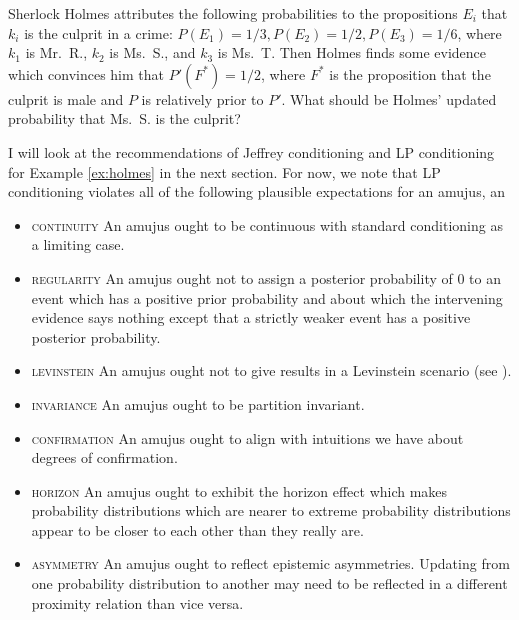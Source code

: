 \documentclass[11pt]{article}
\begin{document}
\begin{quotex}
  \label{ex:holmes} Sherlock Holmes
  attributes the following probabilities to the propositions $E_{i}$
  that $k_{i}$ is the culprit in a crime:
  $P(E_{1})=1/3,P(E_{2})=1/2,P(E_{3})=1/6$, where $k_{1}$ is Mr.\ R.,
  $k_{2}$ is Ms.\ S., and $k_{3}$ is Ms.\ T. Then Holmes finds some
  evidence which convinces him that $P'(F^{*})=1/2$, where $F^{*}$ is
  the proposition that the culprit is male and $P$ is relatively prior
  to $P'$. What should be Holmes' updated probability that Ms.\ S. is
  the culprit?
\end{quotex}

I will look at the recommendations of Jeffrey conditioning and LP
conditioning for Example \ref{ex:holmes} in the next section. For now,
we note that LP conditioning violates all of the following plausible
expectations for an amujus, an 

\begin{itemize}
\item \textsc{continuity} An amujus ought to be continuous with
  standard conditioning as a limiting case.
\item \textsc{regularity} An amujus ought not to assign a posterior
  probability of $0$ to an event which has a positive prior
  probability and about which the intervening evidence says nothing
  except that a strictly weaker event has a positive posterior
  probability.
\item \textsc{levinstein} An amujus ought not to give  results in a Levinstein scenario (see
  ).
\item \textsc{invariance} An amujus ought to be partition invariant.
\item \textsc{confirmation} An amujus ought to align with intuitions
  we have about degrees of confirmation.
\item \textsc{horizon} An amujus ought to exhibit the horizon effect
  which makes probability distributions which are nearer to extreme
  probability distributions appear to be closer to each other than
  they really are.
\item \textsc{asymmetry} An amujus ought to reflect epistemic
  asymmetries. Updating from one probability distribution to another
  may need to be reflected in a different proximity relation than vice
  versa.
\end{itemize}
\end{document}
